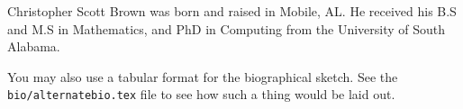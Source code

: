 Christopher Scott Brown was born and raised in Mobile, AL.
 He received his B.S and M.S in Mathematics, and PhD in Computing from the University of South Alabama.

You may also use a tabular format for the biographical sketch.
 See the \texttt{bio/alternatebio.tex} file to see how such a thing would be laid out.
